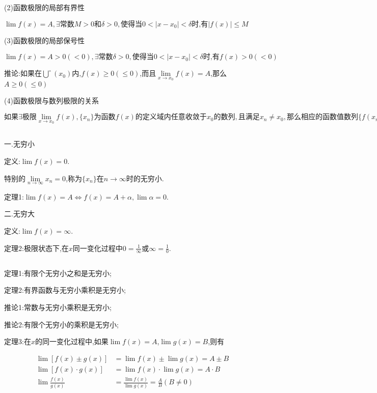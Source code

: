 \documentclass[utf8]{ctexart}
\begin{document}
(2)函数极限的局部有界性

$\lim f(x)=A,\exists \text{常数}M>0\text{和}\delta >0,\text{使得当}0<|x-x_{0}|<\delta \text{时,有}|f(x)|\leqslant M$

(3)函数极限的局部保号性

$\lim f(x)=A>0(<0),\exists \text{常数}\delta >0,\text{使得当}0<|x-x_{0}|<\delta \text{时,有}f(x)>0(<0)$

    推论:如果在$\bigcup \limits^{\circ }(x_{0} )$内,$f(x)\geqslant 0(\leqslant 0)$,而且$\lim \limits_{x \to x_{0}}f(x)=A$,那么$A\geqslant 0(\leqslant 0)$

(4)函数极限与数列极限的关系

$\text{如果}\exists \text{极限}\lim\limits_{x\to x_{0}} f(x),\{x_{n}\}\text{为函数}f(x)\text{的定义域内任意收敛于}x_{0}\text{的数列},\text{且满足}x_{n}\neq x_{0},\text{那么相应的函数值数列}\{f(x_{n})\}\text{必收敛,且}\lim\limits_{n\to\infty }f(x_{n})=\lim\limits_{x\to x_{0} }f(x)$

\subsection{}

一.无穷小

定义:$\lim f(x)=0$.

特别的$\lim \limits _{n\to \infty }x_n=0$,称为$\{x_n\}$在$n \to \infty$时的无穷小.

定理1:$\lim f(x)= A\Longleftrightarrow f(x)=A+\alpha ,\lim\alpha =0$.

二.无穷大

定义:$\lim f(x)=\infty $.

定理2:极限状态下,在$x$同一变化过程中$\displaystyle 0=\frac{1}{\infty}$或$\displaystyle \infty=\frac{1}{0}$.

\subsection{}

定理1:有限个无穷小之和是无穷小;

定理2:有界函数与无穷小乘积是无穷小;

推论1:常数与无穷小乘积是无穷小;

推论2:有限个无穷小的乘积是无穷小;

定理3:在$x$的同一变化过程中,如果$\lim f(x)=A$,$\lim g(x)=B$,则有

\begin{align*} 
    \lim [f(x)\pm g(x)]&=\lim f(x)\pm \lim g(x)=A\pm B \\
    \lim [f(x)\cdot g(x)]&=\lim f(x)\cdot \lim g(x)=A\cdot B\\
    \displaystyle\lim \frac {f(x)}{g(x)} &= \frac{\lim f(x)}{\lim g(x)}=\frac{A}{B}(B\neq 0)\\
\end{align*}
\end{document}
